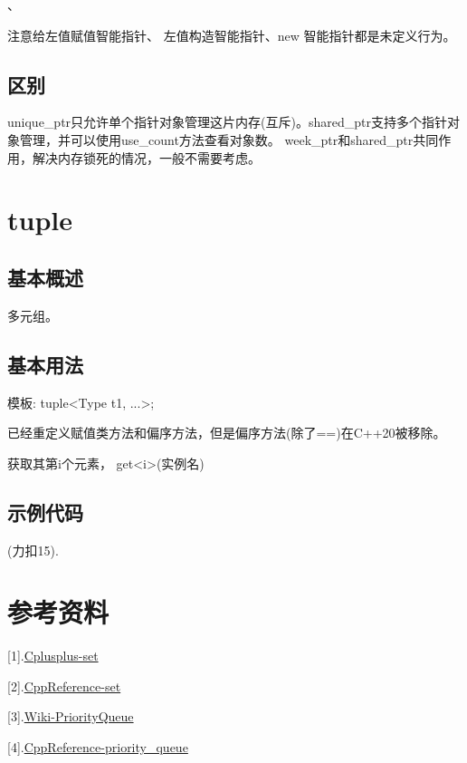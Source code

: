 \documentclass{article}
\begin{document}
    、

    注意给左值赋值智能指针、 左值构造智能指针、new 智能指针都是未定义行为。 

    \subsection{区别}
    unique\_ptr只允许单个指针对象管理这片内存(互斥)。shared\_ptr支持多个指针对象管理，并可以使用use\_count方法查看对象数。
    week\_ptr和shared\_ptr共同作用，解决内存锁死的情况，一般不需要考虑。

    \section{tuple}
    \subsection{基本概述}
    多元组。

    \subsection{基本用法}
    模板:
    tuple<Type t1, ...>;

    已经重定义赋值类方法和偏序方法，但是偏序方法(除了==)在C++20被移除。

    获取其第i个元素， get<i>(实例名)

    \subsection{示例代码}
    (力扣15).
    

    \section*{参考资料}

    [1].\href{https://cplusplus.com/reference/set/set/}{Cplusplus-set}

    [2].\href{https://en.cppreference.com/w/cpp/container/set}{CppReference-set}

    [3].\href{https://en.wikipedia.org/wiki/Priority_queue}{Wiki-PriorityQueue}

    [4].\href{https://en.cppreference.com/w/cpp/container/priority_queue}{CppReference-priority\_queue}
    
\end{document}
